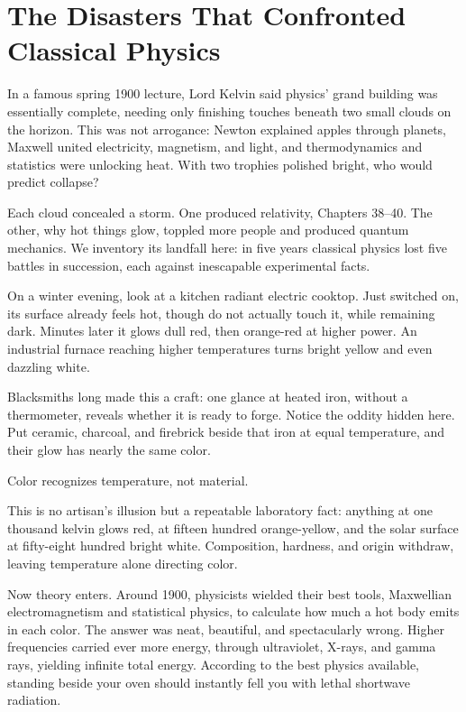 \chapter{The Disasters That Confronted Classical Physics}

In a famous spring 1900 lecture, Lord Kelvin said physics' grand building was essentially complete, needing only finishing touches beneath two small clouds on the horizon. This was not arrogance: Newton explained apples through planets, Maxwell united electricity, magnetism, and light, and thermodynamics and statistics were unlocking heat. With two trophies polished bright, who would predict collapse?

Each cloud concealed a storm. One produced relativity, Chapters 38--40. The other, why hot things glow, toppled more people and produced quantum mechanics. We inventory its landfall here: in five years classical physics lost five battles in succession, each against inescapable experimental facts.


On a winter evening, look at a kitchen radiant electric cooktop. Just switched on, its surface already feels hot, though do not actually touch it, while remaining dark. Minutes later it glows dull red, then orange-red at higher power. An industrial furnace reaching higher temperatures turns bright yellow and even dazzling white.

Blacksmiths long made this a craft: one glance at heated iron, without a thermometer, reveals whether it is ready to forge. Notice the oddity hidden here. Put ceramic, charcoal, and firebrick beside that iron at equal temperature, and their glow has nearly the same color.

Color recognizes temperature, not material.

This is no artisan's illusion but a repeatable laboratory fact: anything at one thousand kelvin glows red, at fifteen hundred orange-yellow, and the solar surface at fifty-eight hundred bright white. Composition, hardness, and origin withdraw, leaving temperature alone directing color.

Now theory enters. Around 1900, physicists wielded their best tools, Maxwellian electromagnetism and statistical physics, to calculate how much a hot body emits in each color. The answer was neat, beautiful, and spectacularly wrong. Higher frequencies carried ever more energy, through ultraviolet, X-rays, and gamma rays, yielding infinite total energy. According to the best physics available, standing beside your oven should instantly fell you with lethal shortwave radiation.


